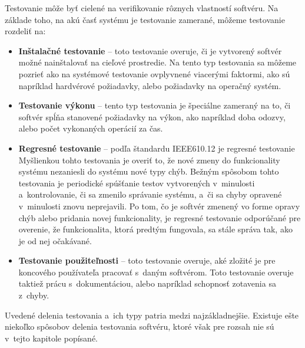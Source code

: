\noindent Testovanie môže byť cielené na verifikovanie rôznych 
vlastností softvéru. Na základe toho, na akú časť systému je 
testovanie zamerané, môžeme testovanie rozdeliť na:
\begin{itemize}
\item \textbf{Inštalačné testovanie} --
toto testovanie overuje, či je vytvorený softvér možné nainštalovať
na cieľové prostredie. Na tento typ testovania sa môžeme pozrieť ako na 
systémové testovanie ovplyvnené viacerými faktormi, ako sú napríklad 
hardvérové požiadavky, alebo požiadavky na operačný systém. 

\item \textbf{Testovanie výkonu} --
tento typ testovania je špeciálne zameraný na to, či softvér spĺňa 
stanovené požiadavky na výkon, ako napríklad doba odozvy, alebo počet 
vykonaných operácií za čas. 

\item \textbf{Regresné testovanie} --
\label{sekcia:regresne_testovanie}
podľa štandardu IEEE610.12 \cite{Ieee_glossary} je regresné testovanie 
Myšlienkou tohto testovania je overiť to, že nové zmeny do funkcionality 
systému nezaniesli do systému nové typy chýb.
Bežným spôsobom tohto testovania je periodické spúšťanie testov 
vytvorených v~minulosti a~kontrolovanie, či sa zmenilo správanie
systému, a~či sa chyby opravené v~minulosti znovu neprejavili. Po tom, 
čo je softvér zmenený vo forme opravy chýb alebo pridania novej 
funkcionality, je regresné testovanie odporúčané pre overenie, že 
funkcionalita, ktorá predtým fungovala, sa stále správa tak, ako je od 
nej očakávané.

\item \textbf{Testovanie použiteľnosti} --
toto testovanie overuje, aké zložité je pre koncového 
používateľa pracovať s~daným softvérom. Toto testovanie overuje taktiež 
prácu s~dokumentáciou, alebo napríklad schopnosť zotavenia sa z~chyby. 
\end{itemize}

Uvedené delenia testovania a~ich typy patria medzi najzákladnejšie. 
Existuje ešte niekoľko spôsobov delenia testovania softvéru, ktoré však 
pre rozsah nie sú v~tejto kapitole popísané.



